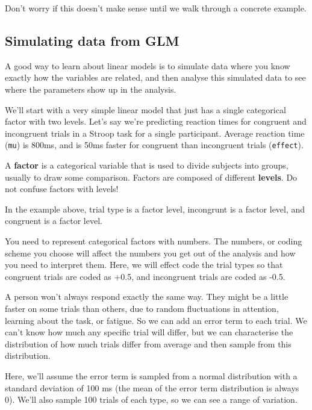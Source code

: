 \documentclass[
  oneside]{book}
\begin{document}
Don't worry if this doesn't make sense until we walk through a concrete example.

\hypertarget{sim-glm}{%
\subsection{Simulating data from GLM}\label{sim-glm}}

A good way to learn about linear models is to simulate data where you know exactly how the variables are related, and then analyse this simulated data to see where the parameters show up in the analysis.

We'll start with a very simple linear model that just has a single categorical factor with two levels. Let's say we're predicting reaction times for congruent and incongruent trials in a Stroop task for a single participant. Average reaction time (\texttt{mu}) is 800ms, and is 50ms faster for congruent than incongruent trials (\texttt{effect}).

\begin{warning}
A \textbf{factor} is a categorical variable that is used to divide subjects into groups, usually to draw some comparison. Factors are composed of different \textbf{levels}. Do not confuse factors with levels!

In the example above, trial type is a factor level, incongrunt is a factor level, and congruent is a factor level.

\end{warning}

You need to represent categorical factors with numbers. The numbers, or coding scheme you choose will affect the numbers you get out of the analysis and how you need to interpret them. Here, we will effect code the trial types so that congruent trials are coded as +0.5, and incongruent trials are coded as -0.5.

A person won't always respond exactly the same way. They might be a little faster on some trials than others, due to random fluctuations in attention, learning about the task, or fatigue. So we can add an error term to each trial. We can't know how much any specific trial will differ, but we can characterise the distribution of how much trials differ from average and then sample from this distribution.

Here, we'll assume the error term is sampled from a normal distribution with a standard deviation of 100 ms (the mean of the error term distribution is always 0). We'll also sample 100 trials of each type, so we can see a range of variation.
\end{document}
